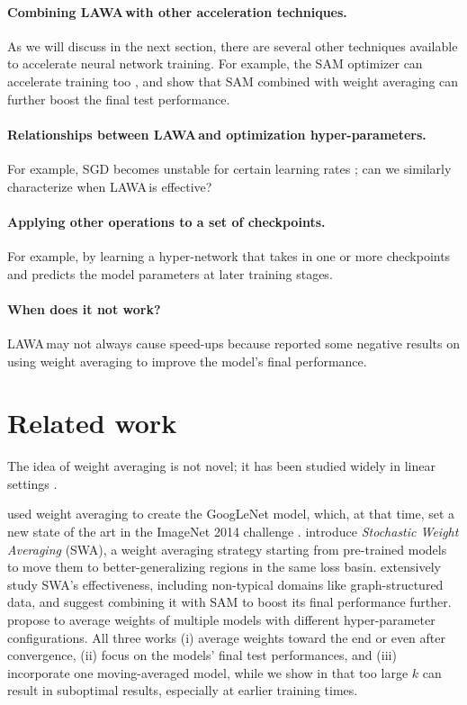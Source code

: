 \documentclass{article}
\newcommand{\method}{LAWA\,}
\begin{document}
\paragraph{Combining \method with other acceleration techniques.} As we will discuss in the next section, there are several other techniques available to accelerate neural network training. For example, the SAM optimizer \cite{SAM} can accelerate training too \cite{mosaicml2022composer}, and \citet{WASAM} show that SAM combined with weight averaging can further boost the final test performance.

\paragraph{Relationships between \method and optimization hyper-parameters.} For example, SGD becomes unstable for certain learning rates \cite{wu2018sgd,Jastrzebski2020The}; can we similarly characterize when \method is effective?

\paragraph{Applying other operations to a set of checkpoints.} For example, by learning a hyper-network \cite{ha2016hypernetworks} that takes in one or more checkpoints and predicts the model parameters at later training stages.

\paragraph{When does it not work?} \method may not always cause speed-ups because \citet{WASAM} reported some negative results on using weight averaging to improve the model's final performance. 


\section{Related work} \label{sec:rw}
The idea of weight averaging is not novel; it has been studied widely in linear settings \cite{polyak_avg,neu2018iterate,lakshminarayanan2018linear}. 

\citet{szegedy2015going} used weight averaging to create the GoogLeNet model, which, at that time, set a new state of the art in the ImageNet 2014 challenge \cite{imagenet}. \citet{SWA} introduce \emph{Stochastic Weight Averaging} (SWA), a weight averaging strategy starting from pre-trained models to move them to better-generalizing regions in the same loss basin. \citet{WASAM} extensively study SWA's effectiveness, including non-typical domains like graph-structured data, and suggest combining it with SAM \cite{SAM} to boost its final performance further. \citet{model_soups} propose to average weights of multiple models with different hyper-parameter configurations. All three works (i) average weights toward the end or even after convergence, (ii) focus on the models' final test performances, and (iii) incorporate one moving-averaged model, while we show in  that too large $k$ can result in suboptimal results, especially at earlier training times.
\end{document}

